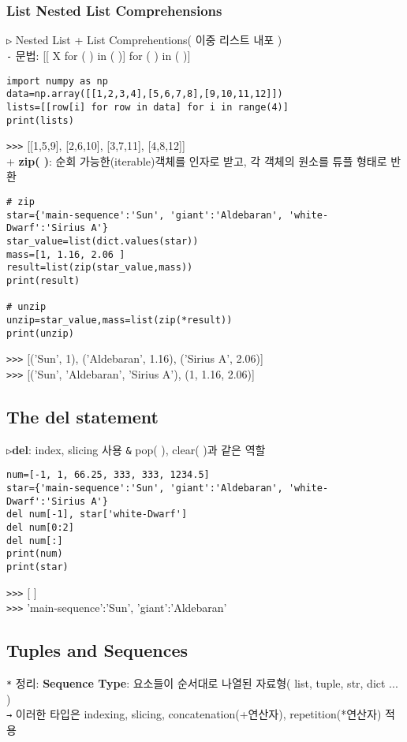 \documentclass[11pt,a4paper]{article}
\begin{document}
\subsubsection{\Large\textbf{List Nested List Comprehensions}}
\begin{spacing}{1.5}
\texttt{▷} Nested List + List Comprehentions( 이중 리스트 내포 )\\
\texttt{-} 문법: [[ X for ( ) in ( )] for ( ) in ( )]
\end{spacing}
\begin{lstlisting}[label={list:first},caption=Nested List Comprehensions]
import numpy as np
data=np.array([[1,2,3,4],[5,6,7,8],[9,10,11,12]])
lists=[[row[i] for row in data] for i in range(4)]
print(lists)
\end{lstlisting}
\texttt{>>>} [[1,5,9], [2,6,10], [3,7,11], [4,8,12]]\\

+ \textbf{zip( )}: 순회 가능한(iterable)객체를 인자로 받고, 각 객체의 원소를 튜플 형태로 반환
\begin{lstlisting}[label={list:first},caption=zip( )]
# zip
star={'main-sequence':'Sun', 'giant':'Aldebaran', 'white-Dwarf':'Sirius A'}
star_value=list(dict.values(star))
mass=[1, 1.16, 2.06 ]
result=list(zip(star_value,mass))
print(result)

# unzip
unzip=star_value,mass=list(zip(*result))
print(unzip)
\end{lstlisting}
\texttt{>>>} [('Sun', 1), ('Aldebaran', 1.16), ('Sirius A', 2.06)]\\
\texttt{>>>} [('Sun', 'Aldebaran', 'Sirius A'), (1, 1.16, 2.06)]\\

\subsection{\Large\textbf{The del statement}}
\texttt{▷}\textbf{del}: index, slicing 사용 \verb|&| pop( ), clear( )과 같은 역할
\begin{lstlisting}[label={list:first},caption=del statement]
num=[-1, 1, 66.25, 333, 333, 1234.5]
star={'main-sequence':'Sun', 'giant':'Aldebaran', 'white-Dwarf':'Sirius A'}
del num[-1], star['white-Dwarf']
del num[0:2]
del num[:]
print(num)
print(star)
\end{lstlisting}
\texttt{>>>} [ ]\\
\texttt{>>>} {'main-sequence':'Sun', 'giant':'Aldebaran'}\\

\subsection{\Large\textbf{Tuples and Sequences}}
\texttt{*} 정리: \textbf{Sequence Type}: 요소들이 순서대로 나열된 자료형( list, tuple, str, dict ... )\\
\texttt{→} 이러한 타입은 indexing, slicing, concatenation(+연산자), repetition(*연산자) 적용\\
\end{document}
